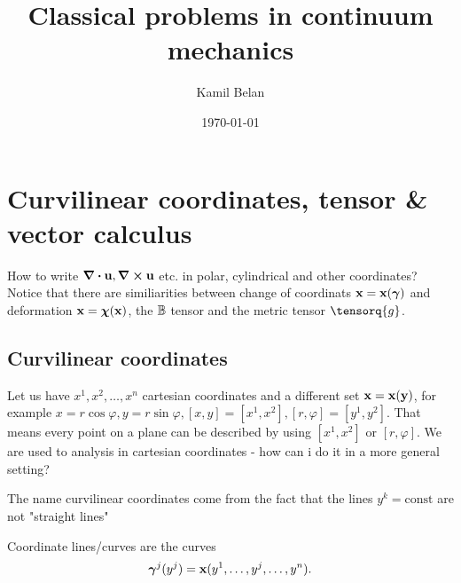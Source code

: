 \documentclass[reqno, a4paper]{article}
\begin{document}
\title{Classical problems in continuum mechanics}

\date{\today}

\author{Kamil Belan}



\begin{comment}
\begin{abstract}
  Here comes the abstract.
\end{abstract}
\end{comment}

\maketitle

\tableofcontents

\section{Curvilinear coordinates, tensor \& vector calculus}
\label{sec:curvilinear_coords}
How to write $\divergence{\vb{u}}, \curl{\vb{u}}$ etc. in polar, cylindrical and other coordinates? Notice that there are similiarities between change of coordinats $\vb{x} = \vb{x}(\vb*{\gamma})$ and deformation $\vb{x}=\vb*{\chi}(\vb{x})$, the $\mathbb{B}$ tensor and the metric tensor $\tensorq{g}$.

\subsection{Curvilinear coordinates}
\label{sec:curvi}
Let us have $x^1,x^2,\dots,x^n$ cartesian coordinates and a different set $\vb{x}=\vb{x}(\vb{y})$, for example $x=r \cos \varphi, y=r \sin \varphi, [x,y]=[x^1,x^2], [r,\varphi] = [y^1,y^2]$. That means every point on a plane can be described by using $[x^1,x^2]$ or $[r,\varphi]$. We are used to analysis in cartesian coordinates - how can i do it in a more general setting?

\begin{remark}
	The name curvilinear coordinates come from the fact that the lines $y^k=\text{const}$ are not "straight lines"
\end{remark}

\begin{definition}
	Coordinate lines/curves are the curves
	\[
		\vb*{\gamma}^j(y^j) = \vb{x}(y^1,\dots,y^j,\dots,y^n).
	\]
	
\end{definition}
\end{document}
